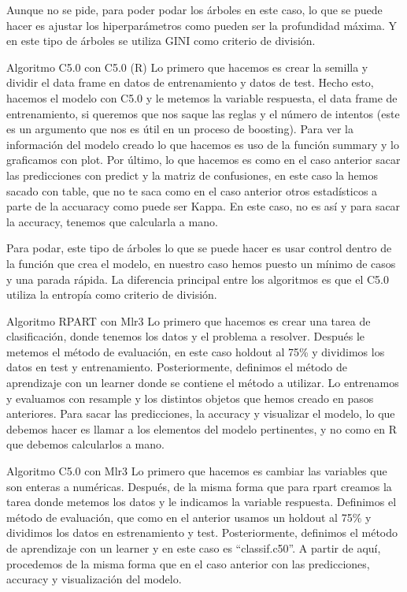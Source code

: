 \documentclass[
  11pt,
  a4paper,
]{article}
\begin{document}
Aunque no se pide, para poder podar los árboles en este caso, lo que se
puede hacer es ajustar los hiperparámetros como pueden ser la
profundidad máxima. Y en este tipo de árboles se utiliza GINI como
criterio de división.

Algoritmo C5.0 con C5.0 (R) Lo primero que hacemos es crear la semilla y
dividir el data frame en datos de entrenamiento y datos de test. Hecho
esto, hacemos el modelo con C5.0 y le metemos la variable respuesta, el
data frame de entrenamiento, si queremos que nos saque las reglas y el
número de intentos (este es un argumento que nos es útil en un proceso
de boosting). Para ver la información del modelo creado lo que hacemos
es uso de la función summary y lo graficamos con plot. Por último, lo
que hacemos es como en el caso anterior sacar las predicciones con
predict y la matriz de confusiones, en este caso la hemos sacado con
table, que no te saca como en el caso anterior otros estadísticos a
parte de la accuaracy como puede ser Kappa. En este caso, no es así y
para sacar la accuracy, tenemos que calcularla a mano.

Para podar, este tipo de árboles lo que se puede hacer es usar control
dentro de la función que crea el modelo, en nuestro caso hemos puesto un
mínimo de casos y una parada rápida. La diferencia principal entre los
algoritmos es que el C5.0 utiliza la entropía como criterio de división.

Algoritmo RPART con Mlr3 Lo primero que hacemos es crear una tarea de
clasificación, donde tenemos los datos y el problema a resolver. Después
le metemos el método de evaluación, en este caso holdout al 75\% y
dividimos los datos en test y entrenamiento. Posteriormente, definimos
el método de aprendizaje con un learner donde se contiene el método a
utilizar. Lo entrenamos y evaluamos con resample y los distintos objetos
que hemos creado en pasos anteriores. Para sacar las predicciones, la
accuracy y visualizar el modelo, lo que debemos hacer es llamar a los
elementos del modelo pertinentes, y no como en R que debemos calcularlos
a mano.

Algoritmo C5.0 con Mlr3 Lo primero que hacemos es cambiar las variables
que son enteras a numéricas. Después, de la misma forma que para rpart
creamos la tarea donde metemos los datos y le indicamos la variable
respuesta. Definimos el método de evaluación, que como en el anterior
usamos un holdout al 75\% y dividimos los datos en estrenamiento y test.
Posteriormente, definimos el método de aprendizaje con un learner y en
este caso es ``classif.c50''. A partir de aquí, procedemos de la misma
forma que en el caso anterior con las predicciones, accuracy y
visualización del modelo.
\end{document}
